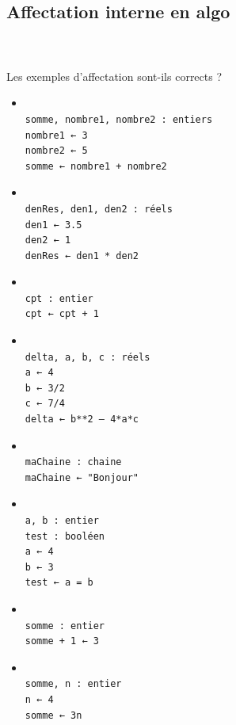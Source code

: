 \documentclass[11pt,a4paper]{article}
\begin{document}
            \par
        \subsection{Affectation interne en algo}
			
		\subparagraph{} 
		
                \textcolor{white}{.} \par
            Les exemples d'affectation sont-ils corrects ?
						
            \begin{itemize} 
        
            \item[ \ding{"6F} ] \begin{verbatim}

somme, nombre1, nombre2 : entiers 
nombre1 ← 3 
nombre2 ← 5 
somme ← nombre1 + nombre2\end{verbatim}
        
            \item[ \ding{"6F} ] \begin{verbatim}

denRes, den1, den2 : réels 
den1 ← 3.5 
den2 ← 1 
denRes ← den1 * den2\end{verbatim}
        
            \item[ \ding{"6F} ] \begin{verbatim}
						
cpt : entier 
cpt ← cpt + 1\end{verbatim}
        
            \item[ \ding{"6F} ] \begin{verbatim}
						
delta, a, b, c : réels 
a ← 4 
b ← 3/2 
c ← 7/4 
delta ← b**2 – 4*a*c\end{verbatim}
        
            \item[ \ding{"6F} ] \begin{verbatim}
						
maChaine : chaine 
maChaine ← "Bonjour"\end{verbatim}
        
            \item[ \ding{"6F} ] \begin{verbatim}
						
a, b : entier 
test : booléen 
a ← 4 
b ← 3 
test ← a = b\end{verbatim}
        
            \item[ \ding{"6F} ] \begin{verbatim}
						
somme : entier 
somme + 1 ← 3\end{verbatim}
        
            \item[ \ding{"6F} ] \begin{verbatim}
						
somme, n : entier 
n ← 4 
somme ← 3n\end{verbatim}
        
            \end{itemize} 
\end{document}
